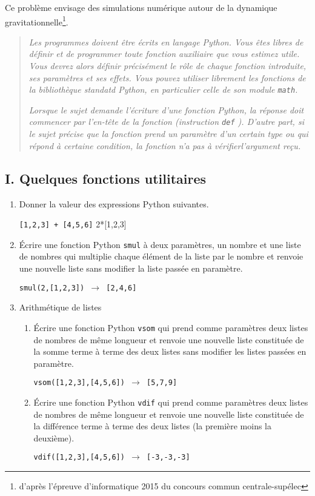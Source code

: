 Ce problème envisage des simulations numérique autour de la dynamique gravitationnelle\footnote{d'après l'épreuve d'informatique 2015 du concours commun centrale-supélec}.

\begin{quotation}
\textit{
Les programmes doivent être écrits en langage Python. Vous êtes libres de définir et de programmer toute fonction auxiliaire que vous estimez utile. Vous devrez alors définir précisément le rôle de chaque fonction introduite, ses paramètres et ses effets. Vous pouvez utiliser librement les fonctions de la bibliothèque standatd Python, en particulier celle de son module \texttt{math}.}

\textit{
Lorsque le sujet demande l'écriture d'une fonction Python, la réponse doit commencer par l'en-tête de la fonction (instruction \texttt{def} ). D'autre part, si le sujet précise que la fonction prend un paramètre d'un certain type ou qui répond à certaine condition, la fonction n'a pas à vérifierl'argument reçu.
}  
\end{quotation}

\subsection*{I. Quelques fonctions utilitaires}
\begin{enumerate}
  \item Donner la valeur des expressions Python suivantes.
\begin{center}
  \texttt{[1,2,3] + [4,5,6]} \hspace{1cm} 2*[1,2,3]
\end{center}
  \item \'Ecrire une fonction Python \texttt{smul} à deux paramètres, un nombre et une liste de nombres qui multiplie chaque élément de la liste par le nombre et renvoie une nouvelle liste sans modifier la liste passée en paramètre.
\begin{center}
  \texttt{smul(2,[1,2,3]) $\longrightarrow$  [2,4,6]}
\end{center}
\item Arithmétique de listes
\begin{enumerate}
  \item \'Ecrire une fonction Python \texttt{vsom} qui prend comme paramètres deux listes de nombres de même longueur et renvoie une nouvelle liste constituée de la somme terme à terme des deux listes  sans modifier les listes passées en paramètre.
\begin{center}
  \texttt{vsom([1,2,3],[4,5,6]) $\longrightarrow$  [5,7,9]}
\end{center}
  \item \'Ecrire une fonction Python \texttt{vdif} qui prend comme paramètres deux listes de nombres de même longueur et renvoie une nouvelle liste constituée de la différence terme à terme des deux listes (la première moins la deuxième).
\begin{center}
  \texttt{vdif([1,2,3],[4,5,6]) $\longrightarrow$  [-3,-3,-3]}
\end{center}
\end{enumerate}
\end{enumerate}

